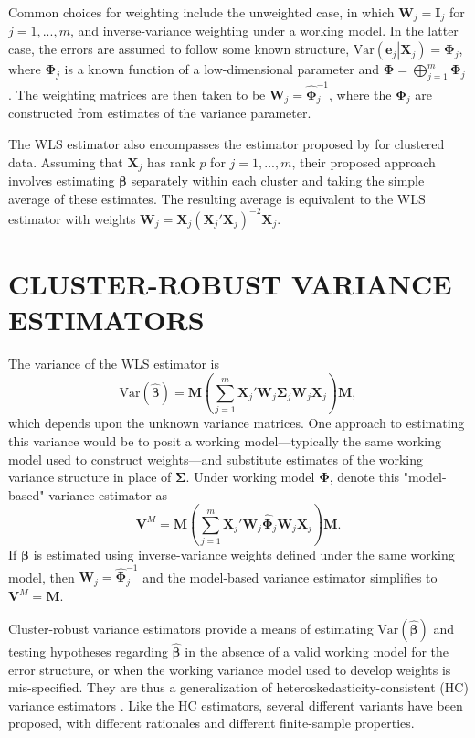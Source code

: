 \documentclass[12pt]{article}\usepackage[]{graphicx}\usepackage[]{color}
\newcommand{\Var}{\text{Var}}
\newcommand{\bm}{\mathbf}
\newcommand{\bs}{\boldsymbol}
\begin{document}
Common choices for weighting include the unweighted case, in which $\bm{W}_j = \bm{I}_j$ for $j = 1,...,m$, and inverse-variance weighting under a working model. 
In the latter case, the errors are assumed to follow some known structure, $\Var\left(\bm{e}_j\left|\bm{X}_j\right.\right) = \bs\Phi_j$, where $\bs\Phi_j$ is a known function of a low-dimensional parameter and $\bs\Phi = \bigoplus_{j=1}^m \bs\Phi_j$. 
The weighting matrices are then taken to be $\bm{W}_j = \hat{\bs\Phi}_j^{-1}$, where the $\hat{\bs\Phi}_j$ are constructed from estimates of the variance parameter.

The WLS estimator also encompasses the estimator proposed by \citet{Ibragimov2010tstatistic} for clustered data. 
Assuming that $\bm{X}_j$ has rank $p$ for $j = 1,...,m$, their proposed approach involves estimating $\bs\beta$ separately within each cluster and taking the simple average of these estimates. 
The resulting average is equivalent to the WLS estimator with weights $\bm{W}_j = \bm{X}_j \left(\bm{X}_j'\bm{X}_j\right)^{-2} \bm{X}_j$.

\section{CLUSTER-ROBUST VARIANCE ESTIMATORS}
\label{sec:CRVE}

The variance of the WLS estimator is 
\begin{equation}
\label{eq:var_WLS}
\Var\left(\bs{\hat\beta}\right) = \bm{M}\left(\sum_{j=1}^m \bm{X}_j' \bm{W}_j \bs\Sigma_j \bm{W}_j\bm{X}_j\right) \bm{M},
\end{equation}
which depends upon the unknown variance matrices. 
One approach to estimating this variance would be to posit a working model---typically the same working model used to construct weights---and substitute estimates of the working variance structure in place of $\bs\Sigma$. 
Under working model $\bs\Phi$, denote this "model-based" variance estimator as
\begin{equation}
\label{eq:V_model}
\bm{V}^M = \bm{M}\left(\sum_{j=1}^m \bm{X}_j' \bm{W}_j \hat{\bs\Phi}_j \bm{W}_j\bm{X}_j\right) \bm{M}.
\end{equation}
If $\bs\beta$ is estimated using inverse-variance weights defined under the same working model, then $\bm{W}_j = \hat{\bs\Phi}_j^{-1}$ and the model-based variance estimator simplifies to $\bm{V}^M = \bm{M}$. 

Cluster-robust variance estimators provide a means of estimating $\Var\left(\bs{\hat\beta}\right)$ and testing hypotheses regarding $\hat{\bs\beta}$ in the absence of a valid working model for the error structure, or when the working variance model used to develop weights is mis-specified. 
They are thus a generalization of heteroskedasticity-consistent (HC) variance estimators \citep{MacKinnon1985some}. 
Like the HC estimators, several different variants have been proposed, with different rationales and different finite-sample properties. 
\end{document}
